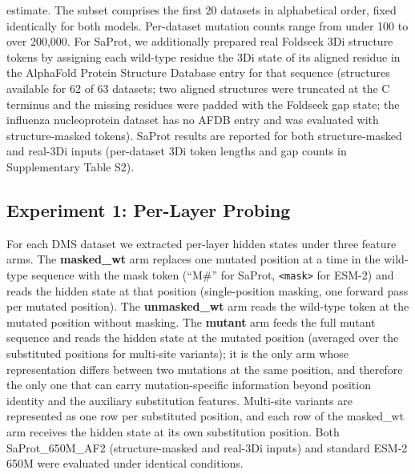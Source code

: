 \documentclass[11pt,a4paper]{article}
\newcommand{\revised}[1]{#1}
\newcommand{\rtwo}[1]{#1}
\newcommand{\rthree}[1]{#1}
\begin{document}
estimate. \revised{The subset comprises the first 20 datasets in alphabetical order,
fixed identically for both models.} Per-dataset mutation counts range from under 100 to over 200,000.
\revised{For SaProt, we additionally prepared real Foldseek 3Di structure tokens by
assigning each wild-type residue the 3Di state of its aligned residue in the
AlphaFold Protein Structure Database entry for that sequence (structures available for
62 of 63 datasets; two aligned structures were truncated at the C terminus and the
missing residues were padded with the Foldseek gap state; the influenza nucleoprotein
dataset has no AFDB entry and was evaluated with structure-masked tokens). SaProt
results are reported for both structure-masked and real-3Di inputs\rtwo{ (per-dataset
3Di token lengths and gap counts in Supplementary Table \rthree{S2})}.}

\subsection{Experiment 1: Per-Layer Probing}

\revised{For each DMS dataset we extracted per-layer hidden states under three feature
arms. The \textbf{masked\_wt} arm replaces \rtwo{one} mutated position \rtwo{at a time}
in the wild-type sequence with the mask token (``M\#'' for SaProt, \texttt{<mask>} for
ESM-2) and reads the hidden state at that position\rtwo{ (single-position masking, one
forward pass per mutated position)}. The
\textbf{unmasked\_wt} arm reads the wild-type token at the mutated position without
masking. The \textbf{mutant} arm feeds the full mutant sequence and reads the hidden
state at the mutated position\rtwo{ (averaged over the substituted positions for
multi-site variants)}; it is the only arm whose representation differs between
two mutations at the same position, and therefore the only one that can carry
mutation-specific information beyond position identity \rthree{and the auxiliary
substitution features}. \rtwo{Multi-site variants are
represented as one row per substituted position, and each row of the masked\_wt arm
receives the hidden state at its own substitution position.} Both SaProt\_650M\_AF2 (structure-masked
and real-3Di inputs) and standard ESM-2 650M were evaluated under identical conditions.}
\end{document}
